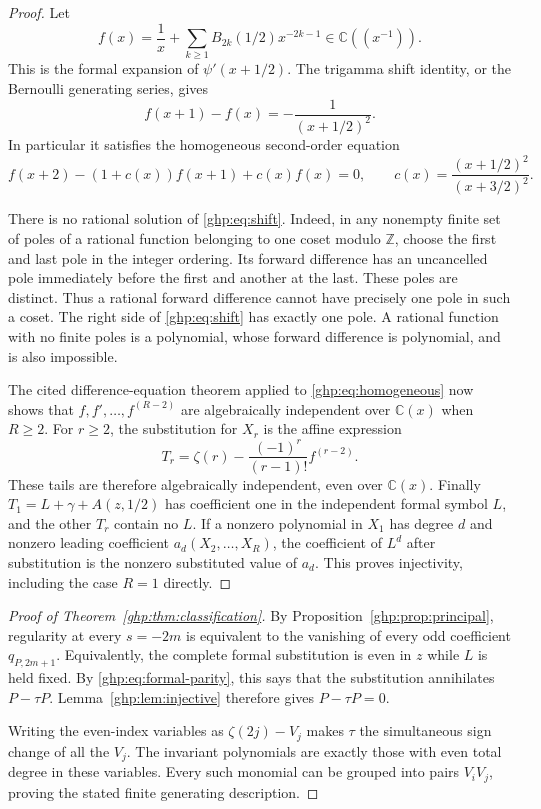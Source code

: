 \documentclass[11pt,a4paper]{article}
\numberwithin{equation}{section}
\theoremstyle{definition}
\theoremstyle{remark}
\begin{document}
\begin{proof}
Let
\begin{equation}\label{ghp:eq:formal-trigamma}
 f(x)=\frac1x+\sum_{k\geq1}B_{2k}(1/2)x^{-2k-1}
        \in\mathbb C((x^{-1})).
\end{equation}
This is the formal expansion of $\psi'(x+1/2)$. The trigamma shift
identity, or the Bernoulli generating series, gives
\begin{equation}\label{ghp:eq:shift}
 f(x+1)-f(x)=-\frac1{(x+1/2)^2}.
\end{equation}
In particular it satisfies the homogeneous second-order equation
\begin{equation}\label{ghp:eq:homogeneous}
 f(x+2)-(1+c(x))f(x+1)+c(x)f(x)=0,
 \qquad c(x)=\frac{(x+1/2)^2}{(x+3/2)^2}.
\end{equation}

There is no rational solution of \eqref{ghp:eq:shift}. Indeed, in any
nonempty finite set of poles of a rational function belonging to one
coset modulo $\mathbb Z$, choose the first and last pole in the integer
ordering. Its forward difference has an uncancelled pole immediately
before the first and another at the last. These poles are distinct.
Thus a rational forward difference cannot have precisely one pole in
such a coset. The right side of \eqref{ghp:eq:shift} has exactly one
pole. A rational function with no finite poles is a polynomial, whose
forward difference is polynomial, and is also impossible.

The cited difference-equation theorem applied to
\eqref{ghp:eq:homogeneous} now shows that
$f,f',\ldots,f^{(R-2)}$ are algebraically independent over
$\mathbb C(x)$ when $R\geq2$. For $r\geq2$, the substitution for $X_r$
is the affine expression
\[
 T_r=\zeta(r)-\frac{(-1)^r}{(r-1)!}f^{(r-2)}.
\]
These tails are therefore algebraically independent, even over
$\mathbb C(x)$. Finally $T_1=L+\gamma+A(z,1/2)$ has coefficient one
in the independent formal symbol $L$, and the other $T_r$ contain no
$L$. If a nonzero polynomial in $X_1$ has degree $d$ and nonzero leading
coefficient $a_d(X_2,\ldots,X_R)$, the coefficient of $L^d$ after
substitution is the nonzero substituted value of $a_d$. This proves
injectivity, including the case $R=1$ directly.
\end{proof}

\begin{proof}[Proof of Theorem~\ref{ghp:thm:classification}]
By Proposition~\ref{ghp:prop:principal}, regularity at every $s=-2m$
is equivalent to the vanishing of every odd coefficient $q_{P,2m+1}$.
Equivalently, the complete formal substitution is even in $z$ while
$L$ is held fixed. By \eqref{ghp:eq:formal-parity}, this says that the
substitution annihilates $P-\tau P$. Lemma~\ref{ghp:lem:injective}
therefore gives $P-\tau P=0$.

Writing the even-index variables as $\zeta(2j)-V_j$ makes $\tau$ the
simultaneous sign change of all the $V_j$. The invariant polynomials
are exactly those with even total degree in these variables. Every
such monomial can be grouped into pairs $V_iV_j$, proving the stated
finite generating description.
\end{proof}
\end{document}
